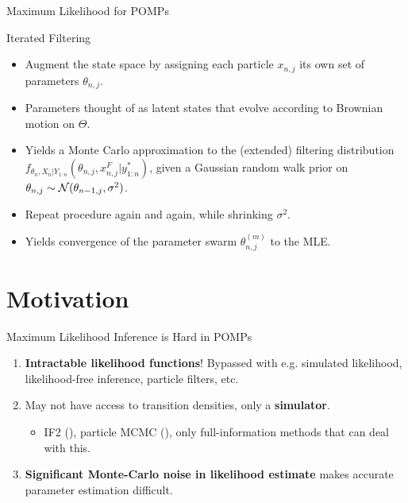 \documentclass{beamer}
\begin{document}
\begin{frame}{Maximum Likelihood for POMPs}
    \begin{block}{Iterated Filtering}
        \begin{itemize}
            \item Augment the state space by assigning each particle $x_{n,j}$ its own set of parameters $\theta_{n,j}$. \pause
            \item Parameters thought of as latent states that evolve according to Brownian motion on $\Theta$.  \pause
            \item Yields a Monte Carlo approximation to the (extended) filtering distribution $f_{\theta_n,X_n|Y_{1:n}}(\theta_{n,j},x_{n,j}^F|y_{1:n}^*)$, given a Gaussian random walk prior on $\theta_{n,j} \sim {\mathcal{N}}(\theta_{n-1,j},\sigma^2)$. \pause
            \item Repeat procedure again and again, while shrinking $\sigma^2$.\pause
            \item Yields convergence of the parameter swarm $\theta_{n,j}^{(m)}$ to the MLE. 
        \end{itemize}
    \end{block}
\end{frame}


\section{Motivation}

\begin{frame}{Maximum Likelihood Inference is Hard in POMPs}
    
\begin{enumerate}
    \item \textbf{Intractable likelihood functions}! Bypassed with e.g. simulated likelihood, likelihood-free inference, particle filters, etc. 
    \item \pause May not have access to transition densities, only a \textbf{simulator}. 
    \begin{itemize}
        \item \pause IF2 (\cite{ionides15}), particle MCMC (\cite{doucet2010pmcmc}), only full-information methods that can deal with this.
    \end{itemize}
    \item \pause \textbf{Significant Monte-Carlo noise in likelihood estimate} makes accurate parameter estimation difficult.
\end{enumerate}
\end{frame}
\end{document}
